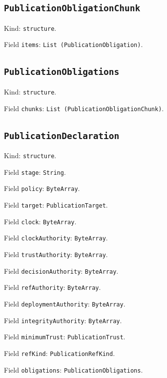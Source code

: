 \documentclass[11pt]{article}
\begin{document}
\subsection*{\texttt{PublicationObligationChunk}}
\noindent Kind: \texttt{structure}.\par
\noindent Field \texttt{items}: \texttt{List (PublicationObligation)}.\par
\subsection*{\texttt{PublicationObligations}}
\noindent Kind: \texttt{structure}.\par
\noindent Field \texttt{chunks}: \texttt{List (PublicationObligationChunk)}.\par
\subsection*{\texttt{PublicationDeclaration}}
\noindent Kind: \texttt{structure}.\par
\noindent Field \texttt{stage}: \texttt{String}.\par
\noindent Field \texttt{policy}: \texttt{ByteArray}.\par
\noindent Field \texttt{target}: \texttt{PublicationTarget}.\par
\noindent Field \texttt{clock}: \texttt{ByteArray}.\par
\noindent Field \texttt{clockAuthority}: \texttt{ByteArray}.\par
\noindent Field \texttt{trustAuthority}: \texttt{ByteArray}.\par
\noindent Field \texttt{decisionAuthority}: \texttt{ByteArray}.\par
\noindent Field \texttt{refAuthority}: \texttt{ByteArray}.\par
\noindent Field \texttt{deploymentAuthority}: \texttt{ByteArray}.\par
\noindent Field \texttt{integrityAuthority}: \texttt{ByteArray}.\par
\noindent Field \texttt{minimumTrust}: \texttt{PublicationTrust}.\par
\noindent Field \texttt{refKind}: \texttt{PublicationRefKind}.\par
\noindent Field \texttt{obligations}: \texttt{PublicationObligations}.\par
\end{document}
